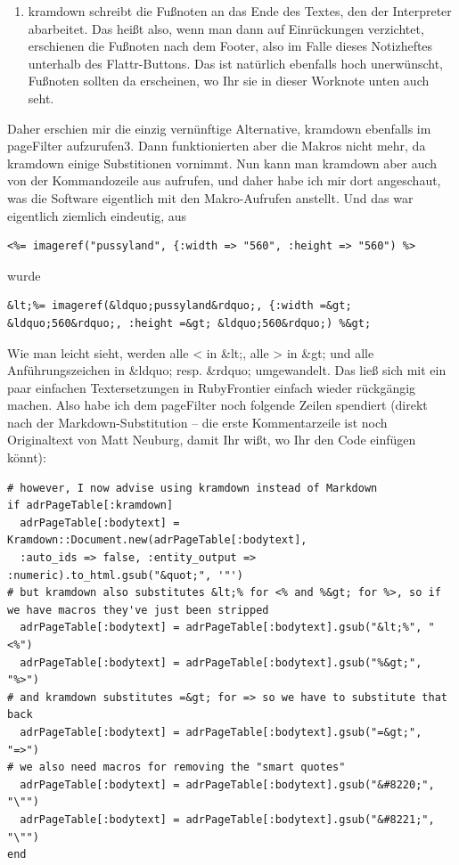 \documentclass[11pt]{report}
\begin{document}
\begin{enumerate}
\item kramdown schreibt die Fußnoten an das Ende des Textes, den der
   Interpreter abarbeitet. Das heißt also, wenn man dann auf
   Einrückungen verzichtet, erschienen die Fußnoten nach dem Footer,
   also im Falle dieses Notizheftes unterhalb des Flattr-Buttons. Das
   ist natürlich ebenfalls hoch unerwünscht, Fußnoten sollten da
   erscheinen, wo Ihr sie in dieser Worknote unten auch seht.
\end{enumerate}


Daher erschien mir die einzig vernünftige Alternative, kramdown
ebenfalls im pageFilter aufzurufen3. Dann funktionierten aber die
Makros nicht mehr, da kramdown einige Substitionen vornimmt. Nun kann
man kramdown aber auch von der Kommandozeile aus aufrufen, und daher
habe ich mir dort angeschaut, was die Software eigentlich mit den
Makro-Aufrufen anstellt. Und das war eigentlich ziemlich eindeutig,
aus


\begin{verbatim}
<%= imageref("pussyland", {:width => "560", :height => "560") %>
\end{verbatim}

wurde


\begin{verbatim}
&lt;%= imageref(&ldquo;pussyland&rdquo;, {:width =&gt;
&ldquo;560&rdquo;, :height =&gt; &ldquo;560&rdquo;) %&gt;
\end{verbatim}

Wie man leicht sieht, werden alle < in \&lt;, alle > in \&gt; und alle
Anführungszeichen in \&ldquo; resp. \&rdquo; umgewandelt. Das ließ sich
mit ein paar einfachen Textersetzungen in RubyFrontier einfach wieder
rückgängig machen. Also habe ich dem pageFilter noch folgende Zeilen
spendiert (direkt nach der Markdown-Substitution – die erste
Kommentarzeile ist noch Originaltext von Matt Neuburg, damit Ihr wißt,
wo Ihr den Code einfügen könnt):


\begin{verbatim}
# however, I now advise using kramdown instead of Markdown
if adrPageTable[:kramdown]
  adrPageTable[:bodytext] = Kramdown::Document.new(adrPageTable[:bodytext],
  :auto_ids => false, :entity_output => :numeric).to_html.gsub("&quot;", '"')
# but kramdown also substitutes &lt;% for <% and %&gt; for %>, so if we have macros they've just been stripped
  adrPageTable[:bodytext] = adrPageTable[:bodytext].gsub("&lt;%", "<%")
  adrPageTable[:bodytext] = adrPageTable[:bodytext].gsub("%&gt;", "%>")
# and kramdown substitutes =&gt; for => so we have to substitute that back
  adrPageTable[:bodytext] = adrPageTable[:bodytext].gsub("=&gt;", "=>")
# we also need macros for removing the "smart quotes"
  adrPageTable[:bodytext] = adrPageTable[:bodytext].gsub("&#8220;", "\"")
  adrPageTable[:bodytext] = adrPageTable[:bodytext].gsub("&#8221;", "\"")
end
\end{verbatim}
\end{document}

